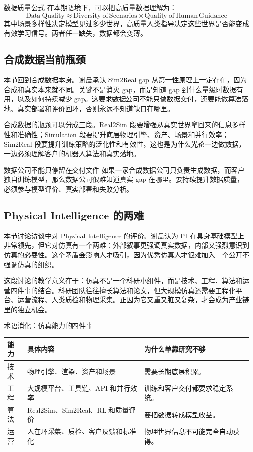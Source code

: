 \documentclass[a4paper]{article}
\begin{document}
\begin{importantbox}{数据质量公式}
在本期语境下，可以把高质量数据理解为：
\[
\mathrm{Data\ Quality}\approx \mathrm{Diversity\ of\ Scenarios}\times \mathrm{Quality\ of\ Human\ Guidance}
\]
其中场景多样性决定模型见过多少世界，高质量人类指导决定这些世界是否能变成有效学习信号。两者任一缺失，数据都会变薄。
\end{importantbox}

\subsection{合成数据当前瓶颈}

本节回到合成数据本身。谢晨承认 Sim2Real gap 从第一性原理上一定存在，因为合成和真实本来就不同。关键不是消灭 gap，而是知道 gap 到什么量级时数据有用，以及如何持续减少 gap。这要求数据公司不能只做数据交付，还要能做算法落地、真实部署和评价回环，否则永远不知道缺口在哪里。

合成数据的瓶颈可以分成三段。Real2Sim 段要增强从真实世界拿回来的信息多样性和准确性；Simulation 段要提升底层物理引擎、资产、场景和并行效率；Sim2Real 段要提升训练策略的泛化性和有效性。这也是为什么光轮一边做数据，一边必须理解客户的机器人算法和真实落地。

\begin{warningbox}{数据公司不能只停留在交付文件}
如果一家合成数据公司只负责生成数据，而客户独自训练模型，那么数据公司很难知道真实 gap 在哪里。要持续提升数据质量，必须参与模型评价、真实部署和失败分析。
\end{warningbox}

\subsection{Physical Intelligence 的两难}

本节讨论访谈中对 Physical Intelligence 的评价。谢晨认为 PI 在具身基础模型上非常领先，但它对仿真有一个两难：外部叙事更强调真实数据，内部又强烈意识到仿真的必要性。这个矛盾会影响人才吸引，因为优秀仿真人才很难加入一个公开不强调仿真的组织。

这段讨论的教学意义在于：仿真不是一个科研小组件，而是技术、工程、算法和运营四件事的结合。科研团队往往擅长算法和论文，但大规模仿真还需要工程化平台、运营流程、人类质检和物理采集。正因为它又重又脏又复杂，才会成为产业链里的独立机会。

\begin{knowledgebox}{术语消化：仿真能力的四件事}
\begin{tabularx}{\textwidth}{p{}p{}X}
\toprule
能力 & 具体内容 & 为什么单靠研究不够 \\
\midrule
技术 & 物理引擎、渲染、资产和场景 & 需要长期底层积累。 \\
工程 & 大规模平台、工具链、API 和并行效率 & 训练和客户交付都要求稳定系统。 \\
算法 & Real2Sim、Sim2Real、RL 和质量评价 & 要把数据转成模型收益。 \\
运营 & 人在环采集、质检、客户反馈和标准化 & 物理世界信息不可能完全自动获得。 \\
\bottomrule
\end{tabularx}
\end{knowledgebox}
\end{document}
